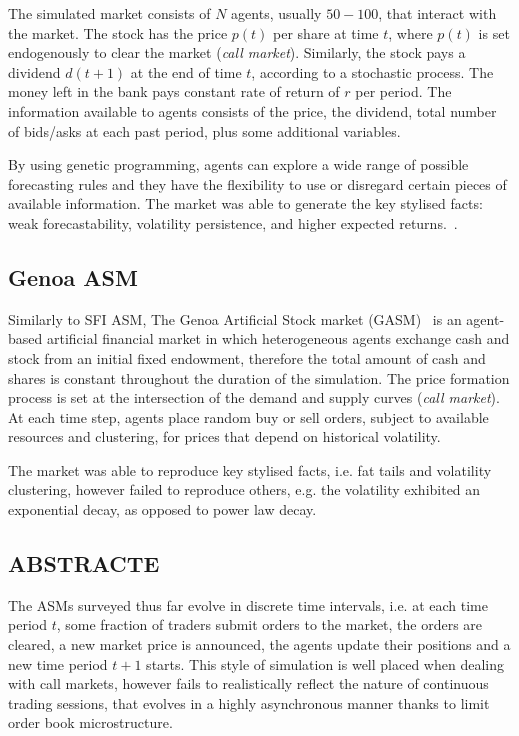 The simulated market consists of $N$ agents, usually $50-100$, that interact with the market. The stock has the price $p(t)$ per share at time $t$, where $p(t)$ is set endogenously to clear the market (\textit{call market}). Similarly, the stock pays a dividend $d(t+1)$ at the end of time $t$, according to a stochastic process. The money left in the bank pays constant rate of return of $r$ per period. The information available to agents consists of the price, the dividend, total number of bids/asks at each past period, plus some additional variables. 

By using genetic programming, agents can explore a wide range of possible forecasting rules and they have the flexibility to use or disregard certain pieces of available information. The market was able to generate the key stylised facts: weak forecastability, volatility persistence, and higher expected returns.~\cite{Lebaron99}.  

\subsection{Genoa ASM}
Similarly to SFI ASM, The Genoa Artificial Stock market (GASM)~\citep{Raberto2001} is an agent-based artificial financial market in which heterogeneous agents exchange cash and stock from an initial fixed endowment, therefore the total amount of cash and shares is constant throughout the duration of the simulation. The price formation process is set at the intersection of the demand and supply curves (\textit{call market}). At each time step, agents place random buy or sell orders, subject to available resources and clustering, for prices that depend on historical volatility.

The market was able to reproduce key stylised facts, i.e. fat tails and volatility clustering, however failed to reproduce others, e.g. the volatility exhibited an exponential decay, as opposed to power law decay.

\subsection{ABSTRACTE}
The ASMs surveyed thus far evolve in discrete time intervals, i.e. at each time period $t$, some fraction of traders submit orders to the market, the orders are cleared, a new market price is announced, the agents update their positions and a new time period $t+1$ starts. This style of simulation is well placed when dealing with call markets, however fails to realistically reflect the nature of continuous trading sessions, that evolves in a highly asynchronous manner thanks to limit order book microstructure.  

